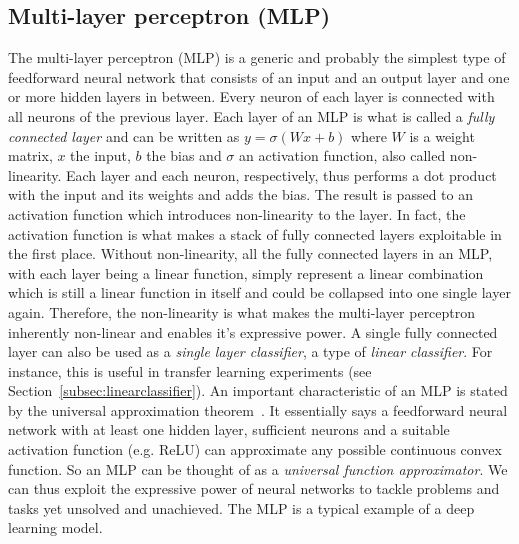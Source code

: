 \documentclass[12pt,a4paper]{article}
\begin{document}
\subsection{Multi-layer perceptron (MLP)}\label{subsec:mlp}
The multi-layer perceptron (MLP) is a generic and probably the simplest type of feedforward neural network that consists of an input and an output layer and one or more hidden layers in between. Every neuron of each layer is connected with all neurons of the previous layer. Each layer of an MLP is what is called a \textit{fully connected layer} and can be written as $y = \sigma (Wx + b)$ where $W$ is a weight matrix, $x$ the input, $b$ the bias and $\sigma$ an activation function, also called non-linearity. Each layer and each neuron, respectively, thus performs a dot product with the input and its weights and adds the bias. The result is passed to an activation function which introduces non-linearity to the layer. In fact, the activation function is what makes a stack of fully connected layers exploitable in the first place. Without non-linearity, all the fully connected layers in an MLP, with each layer being a linear function, simply represent a linear combination which is still a linear function in itself and could be collapsed into one single layer again. Therefore, the non-linearity is what makes the multi-layer perceptron inherently non-linear and enables it's expressive power. A single fully connected layer can also be used as a \textit{single layer classifier}, a type of \textit{linear classifier}. For instance, this is useful in transfer learning experiments (see Section~\ref{subsec:linearclassifier}). An important characteristic of an MLP is stated by the universal approximation theorem~\cite{mlpUnivApprox}. It essentially says a feedforward neural network with at least one hidden layer, sufficient neurons and a suitable activation function (e.g. ReLU) can approximate any possible continuous convex function. So an MLP can be thought of as a \textit{universal function approximator}. We can thus exploit the expressive power of neural networks to tackle problems and tasks yet unsolved and unachieved. The MLP is a typical example of a deep learning model.
\end{document}
